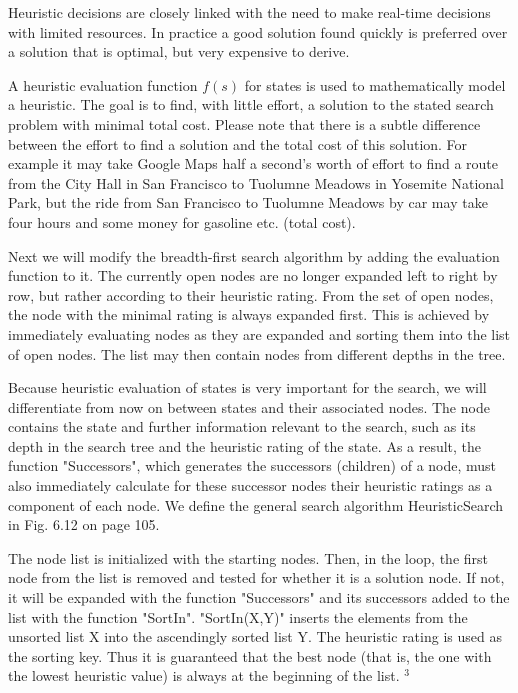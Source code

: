 \documentclass[10pt]{book}
\begin{document}
Heuristic decisions are closely linked with the need to make real-time decisions with limited resources. In practice a good solution found quickly is preferred over a solution that is optimal, but very expensive to derive.

A heuristic evaluation function $f(s)$ for states is used to mathematically model a heuristic. The goal is to find, with little effort, a solution to the stated search problem with minimal total cost. Please note that there is a subtle difference between the effort to find a solution and the total cost of this solution. For example it may take Google Maps half a second's worth of effort to find a route from the City Hall in San Francisco to Tuolumne Meadows in Yosemite National Park, but the ride from San Francisco to Tuolumne Meadows by car may take four hours and some money for gasoline etc. (total cost).

Next we will modify the breadth-first search algorithm by adding the evaluation function to it. The currently open nodes are no longer expanded left to right by row, but rather according to their heuristic rating. From the set of open nodes, the node with the minimal rating is always expanded first. This is achieved by immediately evaluating nodes as they are expanded and sorting them into the list of open nodes. The list may then contain nodes from different depths in the tree.

Because heuristic evaluation of states is very important for the search, we will differentiate from now on between states and their associated nodes. The node contains the state and further information relevant to the search, such as its depth in the search tree and the heuristic rating of the state. As a result, the function "Successors", which generates the successors (children) of a node, must also immediately calculate for these successor nodes their heuristic ratings as a component of each node. We define the general search algorithm HeuristicSearch in Fig. 6.12 on page 105.

The node list is initialized with the starting nodes. Then, in the loop, the first node from the list is removed and tested for whether it is a solution node. If not, it will be expanded with the function "Successors" and its successors added to the list with the function "SortIn". "SortIn(X,Y)" inserts the elements from the unsorted list X into the ascendingly sorted list Y. The heuristic rating is used as the sorting key. Thus it is guaranteed that the best node (that is, the one with the lowest heuristic value) is always at the beginning of the list. ${ }^{3}$
\end{document}
